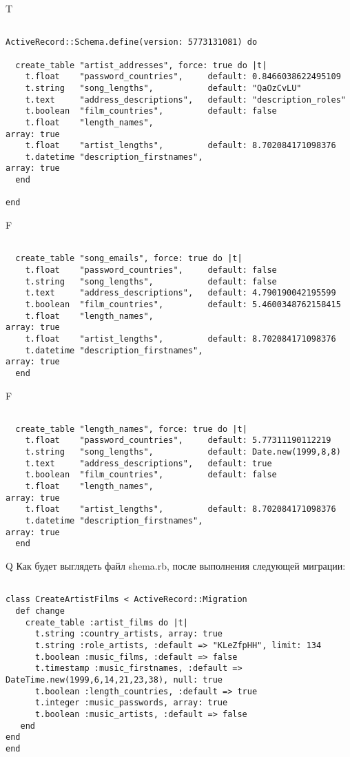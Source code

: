 T
\begin{verbatim}

ActiveRecord::Schema.define(version: 5773131081) do

  create_table "artist_addresses", force: true do |t|
    t.float    "password_countries",     default: 0.8466038622495109
    t.string   "song_lengths",           default: "QaOzCvLU"
    t.text     "address_descriptions",   default: "description_roles"
    t.boolean  "film_countries",         default: false
    t.float    "length_names",                                         array: true
    t.float    "artist_lengths",         default: 8.702084171098376
    t.datetime "description_firstnames",                               array: true
  end

end
\end{verbatim}


F
\begin{verbatim}

  create_table "song_emails", force: true do |t|
    t.float    "password_countries",     default: false
    t.string   "song_lengths",           default: false
    t.text     "address_descriptions",   default: 4.790190042195599
    t.boolean  "film_countries",         default: 5.4600348762158415
    t.float    "length_names",                                         array: true
    t.float    "artist_lengths",         default: 8.702084171098376
    t.datetime "description_firstnames",                               array: true
  end

\end{verbatim}

F
\begin{verbatim}

  create_table "length_names", force: true do |t|
    t.float    "password_countries",     default: 5.77311190112219
    t.string   "song_lengths",           default: Date.new(1999,8,8)
    t.text     "address_descriptions",   default: true
    t.boolean  "film_countries",         default: false
    t.float    "length_names",                                         array: true
    t.float    "artist_lengths",         default: 8.702084171098376
    t.datetime "description_firstnames",                               array: true
  end

\end{verbatim}

Q
Как будет выглядеть файл shema.rb, после выполнения следующей миграции:

\begin{verbatim}

class CreateArtistFilms < ActiveRecord::Migration 
  def change 
    create_table :artist_films do |t| 
      t.string :country_artists, array: true
      t.string :role_artists, :default => "KLeZfpHH", limit: 134
      t.boolean :music_films, :default => false
      t.timestamp :music_firstnames, :default => DateTime.new(1999,6,14,21,23,38), null: true
      t.boolean :length_countries, :default => true
      t.integer :music_passwords, array: true
      t.boolean :music_artists, :default => false
   end
end
end
\end{verbatim}

